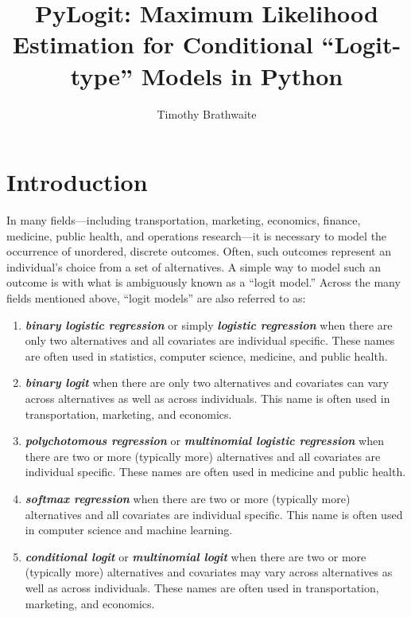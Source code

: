 \documentclass{article}
\title{PyLogit: Maximum Likelihood Estimation for Conditional ``Logit-type'' Models in Python}
\author{Timothy Brathwaite}
\date{}
\begin{document}
\maketitle

\section{Introduction}
In many fields---including transportation, marketing, economics, finance, medicine, public health, and operations research---it is necessary to model the occurrence of unordered, discrete outcomes. Often, such outcomes represent an individual's choice from a set of alternatives. A simple way to model such an outcome is with what is ambiguously known as a ``logit model.'' Across the many fields mentioned above, ``logit models'' are also referred to as:
\begin{enumerate}
\item \textit{\textbf{binary logistic regression}} or simply \textit{\textbf{logistic regression}} when there are only two alternatives and all covariates are individual specific. These names are often used in statistics, computer science, medicine, and public health.

\item \textit{\textbf{binary logit}} when there are only two alternatives and covariates can vary across alternatives as well as across individuals. This name is often used in transportation, marketing, and economics.

\item \textit{\textbf{polychotomous regression}} or \textit{\textbf{multinomial logistic regression}} when there are two or more (typically more) alternatives and all covariates are individual specific. These names are often used in medicine and public health.

\item \textit{\textbf{softmax regression}} when there are two or more (typically more) alternatives and all covariates are individual specific. This name is often used in computer science and machine learning.

\item \textit{\textbf{conditional logit}} or \textit{\textbf{multinomial logit}} when there are two or more (typically more) alternatives and covariates may vary across alternatives as well as across individuals. These names are often used in transportation, marketing, and economics.
\end{enumerate}
\end{document}

